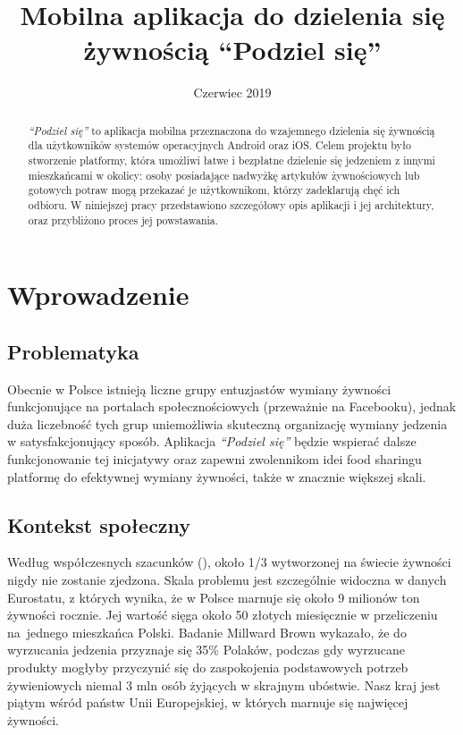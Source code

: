 \documentclass[licencjacka]{pracamgr}
\title{Mobilna aplikacja do dzielenia się żywnością ``Podziel się''}
\date{Czerwiec 2019}
\begin{document}
\maketitle

\begin{abstract}
\textit{``Podziel się''} to aplikacja mobilna przeznaczona do wzajemnego dzielenia się żywnością dla użytkowników systemów operacyjnych Android oraz iOS\@. Celem projektu było stworzenie platformy, która umożliwi łatwe i bezpłatne dzielenie się jedzeniem z innymi mieszkańcami w okolicy: osoby posiadające nadwyżkę artykułów żywnościowych lub gotowych potraw mogą przekazać je użytkownikom, którzy zadeklarują chęć ich odbioru. W niniejszej pracy przedstawiono szczegółowy opis aplikacji i jej architektury, oraz przybliżono proces jej powstawania.
\end{abstract}

\tableofcontents

\chapter*{Wprowadzenie}
\section*{Problematyka}
Obecnie w Polsce istnieją liczne grupy entuzjastów wymiany żywności funkcjonujące na portalach społecznościowych (przeważnie na Facebooku), jednak duża liczebność tych grup uniemożliwia skuteczną organizację wymiany jedzenia w satysfakcjonujący sposób. Aplikacja \textit{``Podziel się''} będzie wspierać dalsze funkcjonowanie tej inicjatywy oraz zapewni zwolennikom idei food sharingu platformę do efektywnej wymiany żywności, także w znacznie większej skali.

\section*{Kontekst społeczny}
Według współczesnych szacunków (\cite{fao}), około 1/3 wytworzonej na świecie żywności nigdy nie zostanie zjedzona. Skala problemu jest szczególnie widoczna w danych Eurostatu, z których wynika, że w Polsce marnuje się około 9 milionów ton żywności rocznie. Jej wartość sięga około 50 złotych miesięcznie w przeliczeniu na~jednego mieszkańca Polski. Badanie Millward Brown wykazało, że do wyrzucania jedzenia przyznaje się 35\% Polaków, podczas gdy wyrzucane produkty mogłyby przyczynić się do zaspokojenia podstawowych potrzeb żywieniowych niemal 3 mln osób żyjących w skrajnym ubóstwie. Nasz kraj jest piątym wśród państw Unii Europejskiej, w których marnuje się najwięcej żywności.
\end{document}
